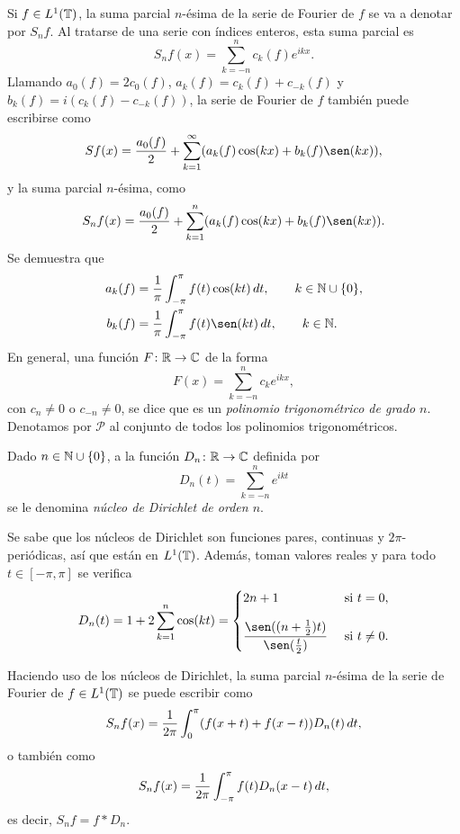 \documentclass[a4paper, 12pt, oneside]{book}
\begin{document}
Si $f \in L^1(\mathbb T)$, la suma parcial $n$-ésima de la serie de Fourier de $f$ se va a denotar por $S_nf$. Al tratarse de una serie con índices enteros, esta suma parcial es
\[S_nf(x) = \sum_{k=-n}^n c_k(f)e^{ikx}.\]
Llamando $a_0(f) = 2c_0(f)$, $a_k(f) = c_k(f)+c_{-k}(f)$ y $b_k(f) = i(c_k(f)-c_{-k}(f))$, la serie de Fourier de $f$ también puede escribirse como
\[Sf(x) = \frac{a_0(f)}{2}+\sum_{k=1}^\infty (a_k(f)\cos(kx)+b_k(f)\sen(kx)),\]
y la suma parcial $n$-ésima, como
\[S_nf(x) = \frac{a_0(f)}{2}+\sum_{k=1}^{n}(a_k(f)\cos(kx)+b_k(f)\sen(kx)).\]
Se demuestra que
\begin{align*}
    a_k(f) &= \frac{1}{\pi}\integral{-\pi}{\pi}{f(t)\cos(kt)}, \qquad k \in \N\cup\{0\}, \\
    b_k(f) &= \frac{1}{\pi}\integral{-\pi}{\pi}{f(t)\sen(kt)}, \qquad k \in \N.
\end{align*}
En general, una función $F \colon \mathbb R \to \mathbb C$ de la forma
\[F(x) = \sum_{k=-n}^n c_ke^{ikx},\]
con $c_n \neq 0$ o $c_{-n}\neq 0$, se dice que es un \emph{polinomio trigonométrico de grado $n$}. Denotamos por $\mathcal{P}$ al conjunto de todos los polinomios trigonométricos.

\begin{definition}
    Dado $n \in \mathbb N \cup \{0\}$, a la función $D_n \colon \mathbb R \to \mathbb C$ definida por
    \[D_n(t) = \sum_{k=-n}^n e^{ikt}\]
    se le denomina \emph{núcleo de Dirichlet de orden $n$}.
\end{definition}

Se sabe que los núcleos de Dirichlet son funciones pares, continuas y $2\pi$-periódicas, así que están en $L^1(\mathbb T)$. Además, toman valores reales y para todo $t \in [-\pi,\pi]$ se verifica
\[D_n(t) = 1+2\sum_{k=1}^n \cos(kt) = \begin{cases}
    2n+1 & $ si $ t = 0, \\[10pt]
    \displaystyle\frac{\sen((n+\frac{1}{2})t)}{\sen(\frac{t}{2})} & $ si $ t \neq 0.
\end{cases}\]

Haciendo uso de los núcleos de Dirichlet, la suma parcial $n$-ésima de la serie de Fourier de $f \in L^1(\mathbb T)$ se puede escribir como
\begin{equation}
    S_nf(x) = \frac{1}{2\pi}\int_{0}^{\pi} (f(x+t)+f(x-t))D_n(t) \, dt,
\end{equation}
o también como
\begin{equation}\label{1.2.4}
    S_nf(x) = \frac{1}{2\pi}\int_{-\pi}^{\pi} f(t)D_n(x-t) \, dt,
\end{equation}
es decir, $S_nf = f \ast D_n$.
\end{document}
